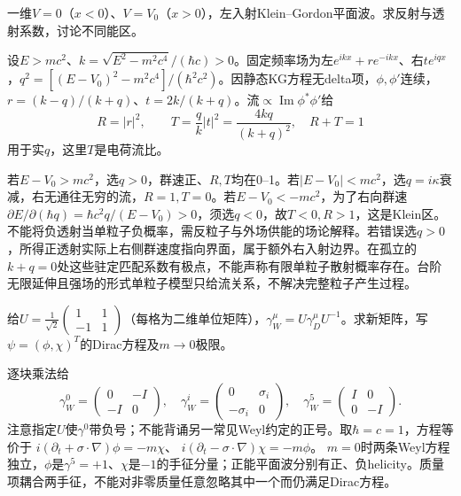 \begin{exercise}
一维$V=0$（$x<0$）、$V=V_0$（$x>0$），左入射Klein--Gordon平面波。求反射与透射系数，讨论不同能区。
\end{exercise}
\begin{solution}
设$E>mc^2$、$k=\sqrt{E^2-m^2c^4}/(\hbar c)>0$。固定频率场为左$e^{ikx}+re^{-ikx}$、右$te^{iqx}$，$q^2=[(E-V_0)^2-m^2c^4]/(\hbar^2c^2)$。因静态KG方程无delta项，$\phi,\phi'$连续，$r=(k-q)/(k+q)$、$t=2k/(k+q)$。流$\propto\operatorname{Im}\phi^*\phi'$给
\[
 R=|r|^2,\qquad T=\frac qk|t|^2=\frac{4kq}{(k+q)^2},\quad R+T=1
\]
用于实$q$，这里$T$是电荷流比。

若$E-V_0>mc^2$，选$q>0$，群速正、$R,T$均在0--1。若$|E-V_0|<mc^2$，选$q=i\kappa$衰减，右无通往无穷的流，$R=1,T=0$。若$E-V_0<-mc^2$，为了右向群速$\partial E/\partial(\hbar q)=\hbar c^2q/(E-V_0)>0$，须选$q<0$，故$T<0,R>1$，这是Klein区。不能将负透射当单粒子负概率，需反粒子与外场供能的场论解释。若错误选$q>0$，所得正透射实际上右侧群速度指向界面，属于额外右入射边界。在孤立的$k+q=0$处这些驻定匹配系数有极点，不能声称有限单粒子散射概率存在。台阶无限延伸且强场的形式单粒子模型只给流关系，不解决完整粒子产生过程。
\end{solution}

\begin{exercise}
给$U=\frac1{\sqrt2}\left(\begin{smallmatrix}1&1\\-1&1\end{smallmatrix}\right)$（每格为二维单位矩阵），$\gamma_W^\mu=U\gamma_D^\mu U^{-1}$。求新矩阵，写$\psi=(\phi,\chi)^T$的Dirac方程及$m\to0$极限。
\end{exercise}
\begin{solution}
逐块乘法给
\[
 \gamma_W^0=\begin{pmatrix}0&-I\\-I&0\end{pmatrix},\quad
 \gamma_W^i=\begin{pmatrix}0&\sigma_i\\-\sigma_i&0\end{pmatrix},\quad
 \gamma_W^5=\begin{pmatrix}I&0\\0&-I\end{pmatrix}.
\]
注意指定$U$使$\gamma^0$带负号；不能背诵另一常见Weyl约定的正号。取$\hbar=c=1$，方程等价于
$i(\partial_t+\sigma\cdot\nabla)\phi=-m\chi$、
$i(\partial_t-\sigma\cdot\nabla)\chi=-m\phi$。
$m=0$时两条Weyl方程独立，$\phi$是$\gamma^5=+1$、$\chi$是$-1$的手征分量；正能平面波分别有正、负helicity。质量项耦合两手征，不能对非零质量任意忽略其中一个而仍满足Dirac方程。
\end{solution}

